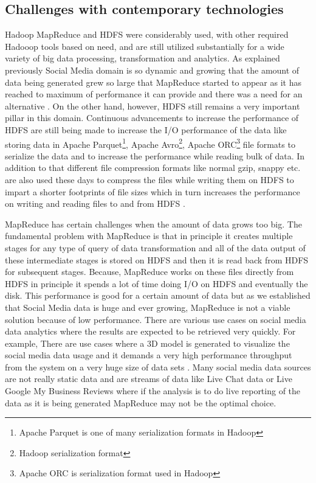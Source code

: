 \documentclass[sigconf]{acmart}
\begin{document}
\subsection{Challenges with contemporary technologies}
Hadoop MapReduce and HDFS were considerably used, with other required Hadooop tools based on need, and are still utilized substantially for a wide variety of big data processing, transformation and analytics. As explained previously Social Media domain is so dynamic and growing that the amount of data being generated  \cite{fbstats} grew so large that MapReduce started to appear as it has reached to maximum of performance it can provide and there was a need for an alternative  \cite{sparkvsmapr}. On the other hand, however, HDFS still remains a very important pillar in this domain. Continuous advancements to increase the performance of HDFS are still being made to increase the I/O performance of the data like storing data in Apache Parquet\footnote{Apache Parquet is one of many serialization formats in Hadoop}, Apache Avro\footnote{Hadoop serialization format}, Apache ORC\footnote{Apache ORC is serialization format used in Hadoop} file formats to serialize the data and to increase the performance while reading bulk of data. In addition to that different file compression formats like normal gzip, snappy etc. are also used these days to compress the files while writing them on HDFS to impart a shorter footprints of file sizes which in turn increases the performance on writing and reading files to and from HDFS \cite{dataformats}.

MapReduce has certain challenges when the amount of data grows too big. The fundamental problem with MapReduce is that in principle it creates multiple stages for any type of query of data transformation and all of the data output of these intermediate stages is stored on HDFS and then it is read back from HDFS for subsequent stages. Because, MapReduce works on these files directly from HDFS in principle it spends a lot of time doing I/O on HDFS and eventually the disk. This performance is good for a certain amount of data but as we established that Social Media data is huge and ever growing, MapReduce is not a viable solution because of low performance. There are various use cases on social media data analytics where the results are expected to be retrieved very quickly. For example, There are use cases where a 3D model is generated to visualize the social media data usage  and it demands a very high performance throughput from the system on a very huge size of data sets  \cite{3dvisual}. Many social media data sources are not really static data and are streams of data like Live Chat data or Live Google My Business Reviews where if the analysis is to do live reporting of the data as it is being generated MapReduce may not be the optimal choice.
\end{document}
